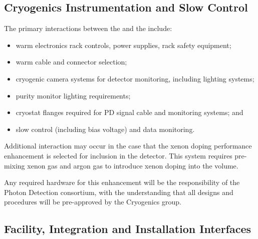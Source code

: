 \subsection{Cryogenics Instrumentation and Slow Control}
\label{sec:fdsp-pd-intfc-xeon}

The primary interactions between the  and the  include:

\begin{itemize}
    \item warm electronics rack controls, power supplies, rack safety equipment;
    \item warm cable and connector selection;
    \item cryogenic camera systems for detector monitoring, including lighting systems;
    \item purity monitor lighting requirements;
    \item cryostat flanges required for PD signal cable and monitoring systems; and
    \item {} slow control (including bias voltage) and data monitoring.
\end{itemize}

Additional interaction may occur in the case that the xenon doping performance enhancement is selected for inclusion in the detector.  This system requires pre-mixing xenon gas and argon gas to introduce xenon doping into the \lar volume. 



Any required hardware for this enhancement will be the responsibility of the Photon Detection consortium, with the understanding that all designs and procedures will be pre-approved by the Cryogenics group. 


\subsection{Facility, Integration and Installation Interfaces}

